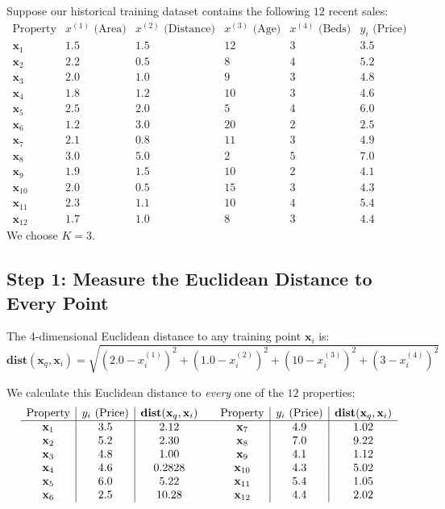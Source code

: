 \documentclass[12pt]{article}
\newcommand{\MVec}[1]{\mathbf{#1}}
\begin{document}
\noindent Suppose our historical training dataset contains the
following $12$ recent sales:
\[
    \begin{array}{c|cccc|c}
        \text{Property} &
            x^{(1)} \text{ (Area)} &
            x^{(2)} \text{ (Distance)} &
            x^{(3)} \text{ (Age)} &
            x^{(4)} \text{ (Beds)} &
            y_i \text{ (Price)} \\ \hline
        \MVec{x}_1 & 1.5 & 1.5 & 12 & 3 & 3.5 \\
        \MVec{x}_2 & 2.2 & 0.5 & 8  & 4 & 5.2 \\
        \MVec{x}_3 & 2.0 & 1.0 & 9  & 3 & 4.8 \\
        \MVec{x}_4 & 1.8 & 1.2 & 10 & 3 & 4.6 \\
        \MVec{x}_5 & 2.5 & 2.0 & 5  & 4 & 6.0 \\
        \MVec{x}_6 & 1.2 & 3.0 & 20 & 2 & 2.5 \\
        \MVec{x}_7 & 2.1 & 0.8 & 11 & 3 & 4.9 \\
        \MVec{x}_8 & 3.0 & 5.0 & 2  & 5 & 7.0 \\
        \MVec{x}_9 & 1.9 & 1.5 & 10 & 2 & 4.1 \\
        \MVec{x}_{10} & 2.0 & 0.5 & 15 & 3 & 4.3 \\
        \MVec{x}_{11} & 2.3 & 1.1 & 10 & 4 & 5.4 \\
        \MVec{x}_{12} & 1.7 & 1.0 & 8  & 3 & 4.4
    \end{array}
\]
We choose $K=3$.

\subsection*{Step 1: Measure the Euclidean Distance to Every Point}
The 4-dimensional Euclidean distance to any training
point $\MVec{x}_i$ is:
\[
    \mathbf{dist}(\MVec{x}_q,\MVec{x}_i)
    = \sqrt{
        (2.0-x_i^{(1)})^2 +
        (1.0-x_i^{(2)})^2 +
        (10-x_i^{(3)})^2  +
        (3-x_i^{(4)})^2
    }
\]

We calculate this Euclidean distance to \textit{every} one of the $12$ properties:
\[
    \begin{array}{c|c|c@{\qquad}c|c|c}
        \text{Property} & y_i \text{ (Price)} & \mathbf{dist}(\MVec{x}_q,\MVec{x}_i)
        & \text{Property} & y_i \text{ (Price)} & \mathbf{dist}(\MVec{x}_q,\MVec{x}_i) \\ \hline
        \MVec{x}_1 & 3.5 & 2.12 & \MVec{x}_7 & 4.9 & 1.02 \\
        \MVec{x}_2 & 5.2 & 2.30 & \MVec{x}_8 & 7.0 & 9.22 \\
        \MVec{x}_3 & 4.8 & 1.00 & \MVec{x}_9 & 4.1 & 1.12 \\
        \MVec{x}_4 & 4.6 & 0.2828 & \MVec{x}_{10} & 4.3 & 5.02 \\
        \MVec{x}_5 & 6.0 & 5.22 & \MVec{x}_{11} & 5.4 & 1.05 \\
        \MVec{x}_6 & 2.5 & 10.28 & \MVec{x}_{12} & 4.4 & 2.02
    \end{array}
\]
\end{document}
